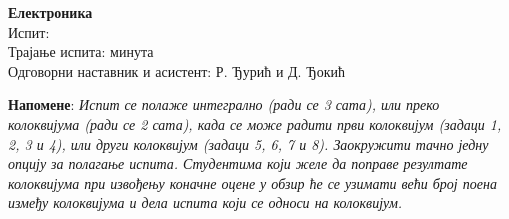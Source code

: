 \documentclass[10pt, a4paper, twoside]{article}
\begin{document}
\noindent
\begin{minipage}[t]{0.5\textwidth}
\begin{flushleft}
\vspace*{0pt}
{\large \textbf{Електроника}} \\[2mm]
Испит: \datumIspita \\
Трајање испита: \trajanjeIspita минута \\
Одговорни наставник и асистент: Р. Ђурић и Д. Ђокић
\end{flushleft}
\end{minipage}
\hfill
\begin{minipage}[t]{0.5\textwidth}
\vspace*{0pt}
\end{minipage}

\vspace*{2.5mm}

\noindent
\textbf{Напомене}: 
\textit{Испит се полаже интегрално (ради се 3 сата), или преко колоквијума (ради се 2 сата), када се може радити први
колоквијум (задаци 1, 2, 3 и 4), или други колоквијум (задаци 5, 6, 7 и 8). 
Заокружити тачно једну опцију за полагање испита.
Студентима који желе да поправе резултате колоквијума 
при извођењу коначне оцене
у обзир ће се узимати већи број поена између колоквијума 
и дела испита који се односи на
колоквијум. 
} \vspace*{2mm}
\end{document}
